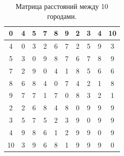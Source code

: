 \documentclass[a4paper, 14pt]{article}
\begin{document}
    \begin{table}[h!]
        \caption{Матрица расстояний между 10 городами.}
            \begin{tabular}{ | c | c | c | c | c | c | c | c | c | c | }
                \hline 0 & 4 & 5 & 7 & 8 & 9 & 2 & 3 & 4 & 10 \\
                \hline 4 & 0 & 3 & 2 & 6 & 7 & 2 & 5 & 9 & 3 \\
                \hline 5 & 3 & 0 & 9 & 8 & 7 & 6 & 7 & 8 & 9 \\
                \hline 7 & 2 & 9 & 0 & 4 & 1 & 8 & 5 & 6 & 6 \\
                \hline 8 & 6 & 8 & 4 & 0 & 7 & 4 & 2 & 1 & 8 \\
                \hline 9 & 7 & 7 & 1 & 7 & 0 & 8 & 3 & 2 & 1 \\
                \hline 2 & 2 & 6 & 8 & 4 & 8 & 0 & 9 & 9 & 9 \\
                \hline 3 & 5 & 7 & 5 & 2 & 3 & 9 & 0 & 9 & 9 \\
                \hline 4 & 9 & 8 & 6 & 1 & 2 & 9 & 9 & 0 & 9 \\
                \hline 10 & 3 & 9 & 6 & 8 & 1 & 9 & 9 & 9 & 0 \\
                \hline
            \end{tabular}
        \label{tab:matr_dist}
    \end{table} 
    
\end{document}
